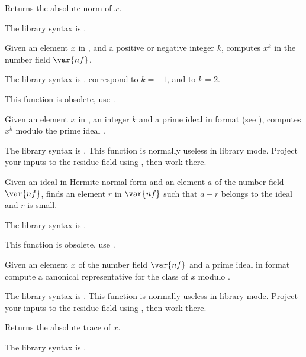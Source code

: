\label{se:nfeltnorm}
Returns the absolute norm of $x$.

The library syntax is .

\label{se:nfeltpow}
Given an element $x$ in , and a positive or negative integer $k$,
computes $x^k$ in the number field $\var{nf}$.

The library syntax is .
 correspond to $k = -1$, and
 to $k = 2$.

\label{se:nfeltpowmodpr}
This function is obsolete, use .

Given an element $x$ in , an integer $k$ and a prime ideal
 in  format
(see ), computes $x^k$ modulo the prime ideal .

The library syntax is .
This function is normally useless in library mode. Project your
inputs to the residue field using , then work there.

\label{se:nfeltreduce}
Given an ideal  in
Hermite normal form and an element $a$ of the number field $\var{nf}$,
finds an element $r$ in $\var{nf}$ such that $a-r$ belongs to the ideal
and $r$ is small.

The library syntax is .

\label{se:nfeltreducemodpr}
This function is obsolete, use .

Given an element $x$ of the number field $\var{nf}$ and a prime ideal
 in  format compute a canonical representative for the
class of $x$ modulo .

The library syntax is .
This function is normally useless in library mode. Project your
inputs to the residue field using , then work there.

\label{se:nfelttrace}
Returns the absolute trace of $x$.

The library syntax is .

